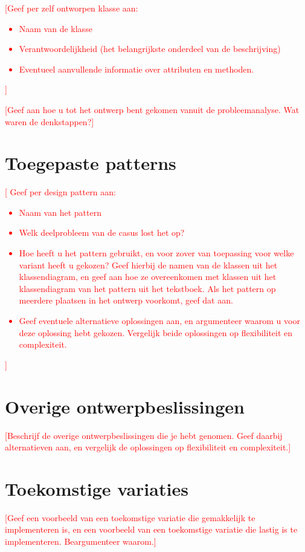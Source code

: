 \documentclass[a4paper]{article}
\newcommand{\todo}[1]{\textcolor{red}{[#1]}}
\begin{document}
\todo{Geef per zelf ontworpen klasse aan:
\begin{itemize}
	\item Naam van de klasse
	\item	Verantwoordelijkheid (het belangrijkste onderdeel van de beschrijving)
	\item	Eventueel aanvullende informatie over attributen en methoden.
\end{itemize}
}

\todo{Geef aan hoe u tot het ontwerp bent gekomen vanuit de probleemanalyse. Wat waren de denkstappen?}

\section{Toegepaste patterns}
\todo{ Geef per design pattern aan:
\begin{itemize}
	\item Naam van het pattern
	\item	Welk deelprobleem van de casus lost het op?
	\item	Hoe heeft u het pattern gebruikt, en voor zover van toepassing voor welke variant heeft u gekozen? Geef hierbij de namen van de klassen uit het klassendiagram, en geef aan hoe ze overeenkomen met klassen uit het klassendiagram van het pattern uit het tekstboek. Als het pattern op meerdere plaatsen in het ontwerp voorkomt, geef dat aan.
	\item	Geef eventuele alternatieve oplossingen aan, en argumenteer waarom u voor deze oplossing hebt gekozen. Vergelijk beide oplossingen op flexibiliteit en complexiteit.
	\end{itemize}
}

\section{Overige ontwerpbeslissingen}
\todo{Beschrijf de overige ontwerpbeslissingen die je hebt genomen. Geef daarbij alternatieven aan, en vergelijk de oplossingen op flexibiliteit en complexiteit.}

\section{Toekomstige variaties}
\todo{Geef een voorbeeld van een toekomstige variatie die gemakkelijk te implementeren is, en een voorbeeld van een toekomstige variatie die lastig is te implementeren. Beargumenteer waarom.}
\end{document}
